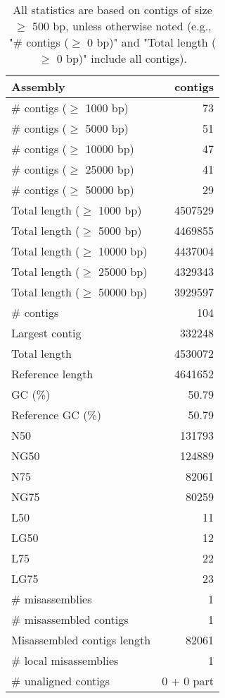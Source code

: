 \documentclass[12pt,a4paper]{article}
\begin{document}
\begin{table}[ht]
\begin{center}
\caption{All statistics are based on contigs of size $\geq$ 500 bp, unless otherwise noted (e.g., "\# contigs ($\geq$ 0 bp)" and "Total length ($\geq$ 0 bp)" include all contigs).}
\begin{tabular}{|l*{1}{|r}|}
\hline
Assembly & contigs \\ \hline
\# contigs ($\geq$ 1000 bp) & 73 \\ \hline
\# contigs ($\geq$ 5000 bp) & 51 \\ \hline
\# contigs ($\geq$ 10000 bp) & 47 \\ \hline
\# contigs ($\geq$ 25000 bp) & 41 \\ \hline
\# contigs ($\geq$ 50000 bp) & 29 \\ \hline
Total length ($\geq$ 1000 bp) & 4507529 \\ \hline
Total length ($\geq$ 5000 bp) & 4469855 \\ \hline
Total length ($\geq$ 10000 bp) & 4437004 \\ \hline
Total length ($\geq$ 25000 bp) & 4329343 \\ \hline
Total length ($\geq$ 50000 bp) & 3929597 \\ \hline
\# contigs & 104 \\ \hline
Largest contig & 332248 \\ \hline
Total length & 4530072 \\ \hline
Reference length & 4641652 \\ \hline
GC (\%) & 50.79 \\ \hline
Reference GC (\%) & 50.79 \\ \hline
N50 & 131793 \\ \hline
NG50 & 124889 \\ \hline
N75 & 82061 \\ \hline
NG75 & 80259 \\ \hline
L50 & 11 \\ \hline
LG50 & 12 \\ \hline
L75 & 22 \\ \hline
LG75 & 23 \\ \hline
\# misassemblies & 1 \\ \hline
\# misassembled contigs & 1 \\ \hline
Misassembled contigs length & 82061 \\ \hline
\# local misassemblies & 1 \\ \hline
\# unaligned contigs & 0 + 0 part \\ \hline

\end{tabular}
\end{center}
\end{table}
\end{document}

